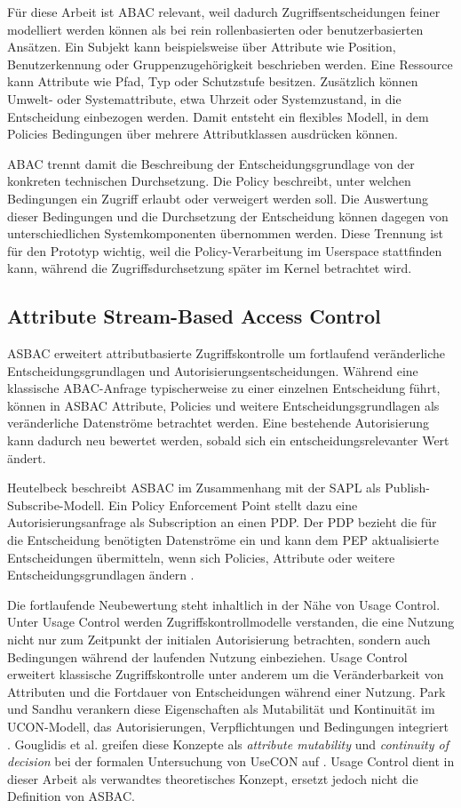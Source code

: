 Für diese Arbeit ist ABAC relevant, weil dadurch Zugriffsentscheidungen feiner modelliert werden können als bei rein rollenbasierten oder benutzerbasierten Ansätzen. 
Ein Subjekt kann beispielsweise über Attribute wie Position, Benutzerkennung oder Gruppenzugehörigkeit beschrieben werden. 
Eine Ressource kann Attribute wie Pfad, Typ oder Schutzstufe besitzen. 
Zusätzlich können Umwelt- oder Systemattribute, etwa Uhrzeit oder Systemzustand, in die Entscheidung einbezogen werden. 
Damit entsteht ein flexibles Modell, in dem Policies Bedingungen über mehrere Attributklassen ausdrücken können.

ABAC trennt damit die Beschreibung der Entscheidungsgrundlage von der konkreten technischen Durchsetzung. 
Die Policy beschreibt, unter welchen Bedingungen ein Zugriff erlaubt oder verweigert werden soll. 
Die Auswertung dieser Bedingungen und die Durchsetzung der Entscheidung können dagegen von unterschiedlichen Systemkomponenten übernommen werden. 
Diese Trennung ist für den Prototyp wichtig, weil die Policy-Verarbeitung im Userspace stattfinden kann, während die Zugriffsdurchsetzung später im Kernel betrachtet wird.

\subsection{Attribute Stream-Based Access Control}
ASBAC erweitert attributbasierte Zugriffskontrolle um fortlaufend veränderliche Entscheidungsgrundlagen und Autorisierungsentscheidungen.
Während eine klassische ABAC-Anfrage typischerweise zu einer einzelnen Entscheidung führt, können in ASBAC Attribute, Policies und weitere Entscheidungsgrundlagen als veränderliche Datenströme betrachtet werden.
Eine bestehende Autorisierung kann dadurch neu bewertet werden, sobald sich ein entscheidungsrelevanter Wert ändert.

Heutelbeck beschreibt ASBAC im Zusammenhang mit der SAPL als Publish-Subscribe-Modell.
Ein Policy Enforcement Point stellt dazu eine Autorisierungsanfrage als Subscription an einen PDP.
Der PDP bezieht die für die Entscheidung benötigten Datenströme ein und kann dem PEP aktualisierte Entscheidungen übermitteln, wenn sich Policies, Attribute oder weitere Entscheidungsgrundlagen ändern \citep{heutelbeck2021asbac}.

Die fortlaufende Neubewertung steht inhaltlich in der Nähe von Usage Control.
Unter Usage Control werden Zugriffskontrollmodelle verstanden, die eine Nutzung nicht nur zum Zeitpunkt der initialen Autorisierung betrachten, sondern auch Bedingungen während der laufenden Nutzung einbeziehen.
Usage Control erweitert klassische Zugriffskontrolle unter anderem um die Veränderbarkeit von Attributen und die Fortdauer von Entscheidungen während einer Nutzung.
Park und Sandhu verankern diese Eigenschaften als Mutabilität und Kontinuität im UCON-Modell, das Autorisierungen, Verpflichtungen und Bedingungen integriert \citep{park2004ucon}.
Gouglidis et al. greifen diese Konzepte als \emph{attribute mutability} und \emph{continuity of decision} bei der formalen Untersuchung von UseCON auf \citep{gouglidis2018usecon}.
Usage Control dient in dieser Arbeit als verwandtes theoretisches Konzept, ersetzt jedoch nicht die Definition von ASBAC.

